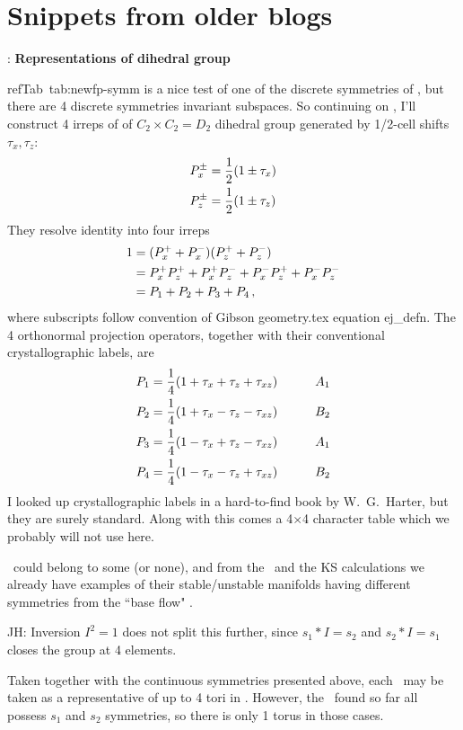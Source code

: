 \section{Snippets from older blogs}

: {\bf Representations of dihedral group}

 refTab~{tab:newfp-symm}
is a nice test of one of the discrete symmetries of \pCf, but there are 4
discrete symmetries invariant subspaces.
So continuing on , I'll construct 4 irreps of of $C_2
\times C_2 = D_2$ dihedral group generated by 1/2-cell shifts $\tau_x,
\tau_z$:
\begin{align}
P_x^\pm &= \frac{1}{2}(1 \pm \tau_x)
    \nonumber \\ 
P_z^\pm &= \frac{1}{2}(1 \pm \tau_z)
\end{align}
They resolve identity into four irreps
\begin{align}
1 &= ({P}_x^+ + {P}_x^-) ({P}_z^+ + {P}_z^-)
    \nonumber \\ 
  &=  {P}_x^+ {P}_z^+
   +  {P}_x^+ {P}_z^-
   +  {P}_x^- {P}_z^+
   +  {P}_x^- {P}_z^-
    \nonumber \\ 
  &= {P}_1 + {P}_2 + {P}_3 + {P}_4
    \,,
\label{projOp:tau1}
\end{align}
where subscripts follow convention of Gibson geometry.tex equation
ej\_defn. The 4 orthonormal projection operators, together with their
conventional crystallographic labels, are
\begin{align}
P_1 &= \frac{1}{4}({1} + \tau_x + \tau_z + \tau_{xz})
    & \qquad    A_1
    \nonumber \\ 
P_2 &= \frac{1}{4}({1} + \tau_x - \tau_z - \tau_{xz})
    & \qquad    B_2
    \nonumber \\ 
P_3 &= \frac{1}{4}({1} - \tau_x + \tau_z - \tau_{xz})
    & \qquad    A_1
    \nonumber \\ 
P_4 &= \frac{1}{4}({1} - \tau_x - \tau_z + \tau_{xz})
    & \qquad    B_2
\label{projOp:taus}
\end{align}
I looked up crystallographic labels in a hard-to-find book by
W.~G.~Harter, but they are surely standard. Along with this comes a
4$\times$4 character table which we probably will not use here.

\Eqva\ could belong to some (or none), and from the \ubranch\ and the KS
calculations we already have examples of their stable/unstable manifolds
having different symmetries from the ``base flow" \eqv.

JH:{ Inversion  $I^2=1$ does not split this further, since
$s_1*I = s_2$ and $s_2*I=s_1$ closes the group at 4 elements.
   }

Taken together with the continuous symmetries presented above, each
\eqva\ may be taken as a representative of up to 4 tori in \statesp .
However, the \eqva\ found so far all possess $s_1$ and $s_2$ symmetries,
so there is only 1 torus in those cases.

